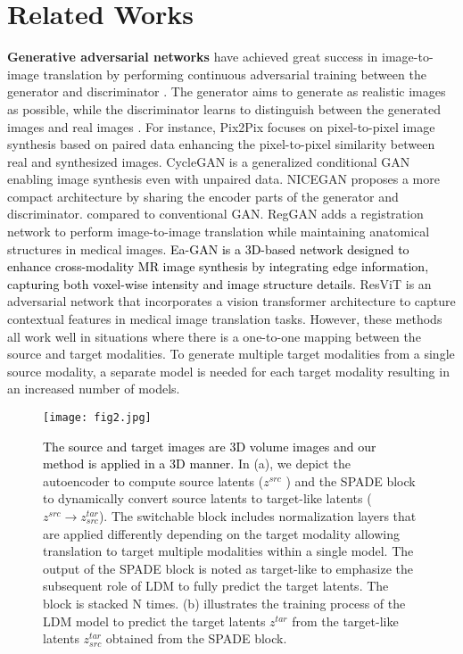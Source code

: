 \documentclass[10pt,twocolumn,letterpaper]{article}
\newcommand{\jhk}[2]{\textcolor{black}{{}#2}}
\begin{document}
\section{Related Works}

 \noindent \textbf{Generative adversarial networks} have achieved great success in image-to-image translation by performing continuous adversarial training between the generator and discriminator \cite{NIPS2014_5ca3e9b1, isola2017image, zhu2017unpaired, chen2020reusing, NEURIPS2021_0f281810}. The generator aims to generate as realistic images as possible, while the discriminator learns to distinguish between the generated images and real images \cite{NIPS2014_5ca3e9b1}. For instance, Pix2Pix \cite{isola2017image} focuses on pixel-to-pixel image synthesis based on paired data enhancing the pixel-to-pixel similarity between real and synthesized images. CycleGAN \cite{zhu2017unpaired} is a generalized conditional GAN enabling image synthesis even with unpaired data. NICEGAN \cite{chen2020reusing} proposes a more compact architecture by sharing the encoder parts of the generator and discriminator. compared to conventional GAN. RegGAN \cite{NEURIPS2021_0f281810} adds a registration network to perform image-to-image translation while maintaining anatomical structures in medical images. \jhk{}{Ea-GAN \cite{yu2019ea} is a 3D-based network designed to enhance cross-modality MR image synthesis by integrating edge information, capturing both voxel-wise intensity and image structure details}. ResViT \cite{dalmaz2022resvit} is an adversarial network that incorporates a vision transformer architecture to capture contextual features in medical image translation tasks. However, these methods all work well in situations where there is a one-to-one mapping between the source and target modalities. To generate multiple target modalities from a single source modality, a separate  model is needed for each target modality resulting in an increased number of models.

\begin{figure*} [ht]
    \texttt{[image: fig2.jpg]}
    \vspace{-6pt}
    \caption{\jhk{}{The source and target images are 3D volume images and our method is applied in a 3D  manner. } In (a), we depict the autoencoder to compute source latents ($z^{src}$ ) and the SPADE block to dynamically convert source latents to target-like latents ($z^{src} \rightarrow z^{tar}_{src}$). The switchable block includes normalization layers that are applied differently depending on the target modality allowing translation to target multiple modalities within a single model. The output of the SPADE block is noted as target-like to emphasize the subsequent role of LDM to fully predict the target latents. The block is stacked N times. (b) illustrates the training process of the LDM model to predict the target latents $z^{tar}$ from the target-like latents $z_{src}^{tar}$ obtained from the SPADE block.}
    \label{fig2}
\end{figure*}
\end{document}
